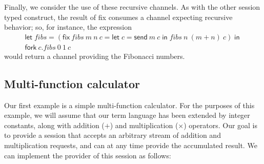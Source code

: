 \documentclass[orivec,envcountsame]{llncs}
\newcommand{\mkwd}[1]{\mathsf{#1}}
\newcommand{\tkwd}[1]{\textsf{#1}}
\newcommand{\gvsend}[2]{\mkwd{send}\:#1\:#2}
\newcommand{\gvlet}[3]{\mkwd{let}\;#1 = #2\;\mkwd{in}\;#3}
\newcommand{\gvfork}[2]{\mkwd{fork}\:#1.#2}
\newcommand{\lrkwd}{\mkwd{fix}}
\newcommand{\gvfix}[3]{\lrkwd\:#1\:#2 = #3}
\begin{document}
Finally, we consider the use of these recursive channels.  As with the other session typed
construct, the result of \tkwd{fix} consumes a channel expecting recursive behavior; so, for
instance, the expression
\[\begin{array}{l}
\gvlet{fibs}{(\gvfix{fibs}{m\:n\:c}{\gvlet{c}{\gvsend{m}{c}}{fibs\:n\:(m + n)\:c}})}{} \\
\gvfork{c}{fibs\:0\:1\:c}
\end{array}\]
would return a channel providing the Fibonacci numbers.

\subsection{Multi-function calculator}

Our first example is a simple multi-function calculator.  For the purposes of this example, we will
assume that our term language has been extended by integer constants, along with addition ($+$) and
multiplication ($\times$) operators.  Our goal is to provide a session that accepts an arbitrary
stream of addition and multiplication requests, and can at any time provide the accumulated result.
We can implement the provider of this session as follows:

\newcommand{\mcl}[2]{\multicolumn{#1}{l}{#2}}
\end{document}
